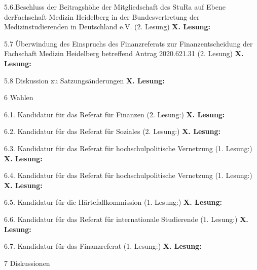 5.6.Beschluss der Beitragshöhe der Mitgliedschaft des StuRa auf Ebene derFachschaft Medizin Heidelberg in der Bundesvertretung der Medizinstudierenden in Deutschland e.V. (2. Lesung)
\textbf{X. Lesung:}
\ul{
}

5.7 Überwindung des Einspruchs des Finanzreferats zur Finanzentscheidung der Fachschaft Medizin Heidelberg betreffend Antrag 2020.621.31 (2. Lesung)
\textbf{X. Lesung:}
\ul{
}

5.8 Diskussion zu Satzungsänderungen
\textbf{X. Lesung:}
\ul{
}

6 Wahlen

6.1.  Kandidatur für das Referat für Finanzen (2. Lesung:)
\textbf{X. Lesung:}
\ul{
}

6.2.  Kandidatur für das Referat für Soziales (2. Lesung:)
\textbf{X. Lesung:}
\ul{
}

6.3.  Kandidatur für das Referat für hochschulpolitische Vernetzung (1. Lesung:)
\textbf{X. Lesung:}
\ul{
}

6.4.  Kandidatur für das Referat für hochschulpolitische Vernetzung (1. Lesung:)
\textbf{X. Lesung:}
\ul{
}

6.5.  Kandidatur für die Härtefallkommission (1. Lesung:)
\textbf{X. Lesung:}
\ul{
}

6.6.  Kandidatur für das Referat für internationale Studierende (1. Lesung:)
\textbf{X. Lesung:}
\ul{
}

6.7.  Kandidatur für das Finanzreferat (1. Lesung:)
\textbf{X. Lesung:}
\ul{
}

7 Diskussionen

